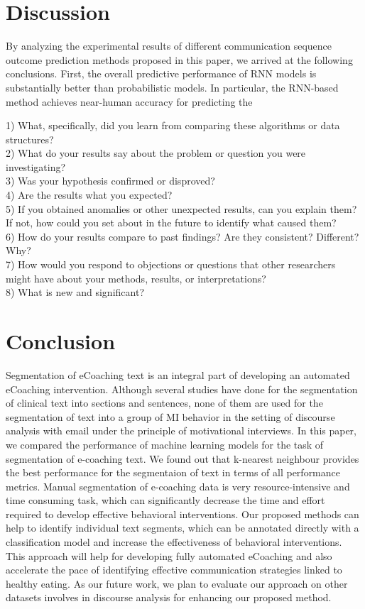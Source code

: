 \documentclass{amia}
\begin{document}
\section*{Discussion}
By analyzing the experimental results of different communication sequence outcome prediction methods proposed in this paper, we arrived at the following conclusions. First, the overall predictive
performance of RNN models is substantially better than probabilistic models. In particular, the RNN-based method achieves near-human accuracy for predicting the 


1) What, specifically, did you learn from comparing these algorithms or data structures? \\
2) What do your results say about the problem or question you were investigating?\\
3) Was your hypothesis confirmed or disproved?\\
4) Are the results what you expected?\\
5) If you obtained anomalies or other unexpected results, can you explain them? If not, how could you set about in the future to identify what caused them? \\
6) How do your results compare to past findings? Are they consistent? Different?Why? \\
7) How would you respond to objections or questions that other researchers might have about your methods, results, or interpretations? \\
8) What is new and significant?\\
 
\section*{Conclusion}
Segmentation of eCoaching text is an integral part of developing an automated eCoaching intervention. Although several studies have done for the segmentation of clinical text into sections and sentences, none of them are used for the segmentation of text into a group of MI behavior in the setting of discourse analysis with email under the principle of motivational interviews. In this paper, we compared the performance of machine learning models for the task of segmentation of e-coaching text. We found out that k-nearest neighbour provides the best performance for the segmentaion of text in terms of all performance metrics. Manual segmentation of e-coaching data is very resource-intensive and time consuming task, which can significantly decrease the time and effort required to develop effective behavioral interventions. Our proposed methods can help to identify individual text segments, which can be annotated directly with a classification model and increase the effectiveness of behavioral interventions. This approach will help for developing fully automated eCoaching and also accelerate the pace of identifying effective communication strategies linked to healthy eating. As our future work, we plan to evaluate our approach on other datasets involves in discourse analysis for enhancing our proposed method.  
\end{document}
